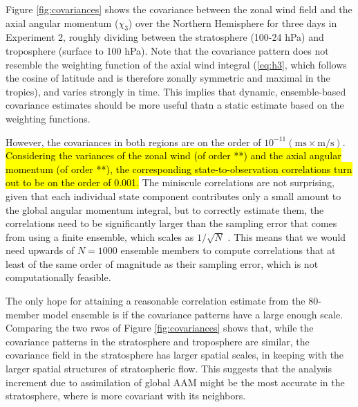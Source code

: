 Figure \ref{fig:covariances} shows the covariance between the zonal wind field and the axial angular momentum ($\chi_3$) over the Northern Hemisphere for three days in Experiment 2, roughly dividing between the 
stratosphere (100-24 hPa) 
and
troposphere (surface to 100 hPa).
Note that the covariance pattern does not resemble the weighting function of the axial wind integral (\ref{eq:h3}, which follows the cosine of latitude and is therefore zonally symmetric and maximal in the tropics), and varies strongly in time. 
This implies that dynamic, ensemble-based covariance estimates should be more useful thatn a static estimate based on the weighting functions.

However, the covariances in both regions are on the order of $10^{-11}(\text{ms} \times \text{m/s})$.  
\hl{Considering the variances of the zonal wind (of order **) and the axial angular momentum (of order **), the corresponding state-to-observation correlations turn out to be on the order of 0.001.} 
The miniscule correlations are not surprising, given that each individual state component contributes only a small amount to the global angular momentum integral, but to 
correctly estimate them, the correlations need to be significantly larger than the sampling error that comes from using a finite ensemble, which 
scales as $1/\sqrt{N}$ \citep{Houtekamer1998}. 
This means that we would need upwards of $N=1000$ ensemble members to compute correlations that at least of the same order of magnitude as their sampling error, which is not computationally feasible. 

The only hope for attaining a reasonable correlation estimate from the 80-member model ensemble is if the covariance patterns have a large enough scale.  
Comparing the two rwos of Figure \ref{fig:covariances} shows that, while
the covariance patterns in the stratosphere and troposphere are similar, the covariance field in the stratosphere has larger spatial scales, in keeping with the larger spatial structures of stratospheric flow.
This suggests that the analysis increment due to assimilation of global AAM might be the most accurate in the stratosphere, where is more covariant with its neighbors.  

